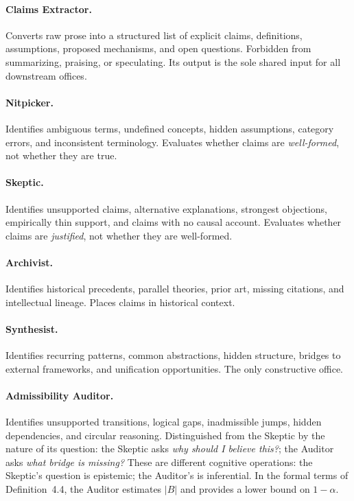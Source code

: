 \documentclass[12pt, a4paper]{article}
\theoremstyle{principle}
\theoremstyle{definition}
\begin{document}
\paragraph{Claims Extractor.}
Converts raw prose into a structured list of explicit claims, definitions,
assumptions, proposed mechanisms, and open questions. Forbidden from summarizing,
praising, or speculating. Its output is the sole shared input for all downstream
offices.

\paragraph{Nitpicker.}
Identifies ambiguous terms, undefined concepts, hidden assumptions, category errors,
and inconsistent terminology. Evaluates whether claims are \emph{well-formed}, not
whether they are true.

\paragraph{Skeptic.}
Identifies unsupported claims, alternative explanations, strongest objections,
empirically thin support, and claims with no causal account. Evaluates whether
claims are \emph{justified}, not whether they are well-formed.

\paragraph{Archivist.}
Identifies historical precedents, parallel theories, prior art, missing citations,
and intellectual lineage. Places claims in historical context.

\paragraph{Synthesist.}
Identifies recurring patterns, common abstractions, hidden structure, bridges to
external frameworks, and unification opportunities. The only constructive office.

\paragraph{Admissibility Auditor.}
Identifies unsupported transitions, logical gaps, inadmissible jumps, hidden
dependencies, and circular reasoning. Distinguished from the Skeptic by the nature
of its question: the Skeptic asks \emph{why should I believe this?}; the Auditor
asks \emph{what bridge is missing?} These are different cognitive operations: the
Skeptic's question is epistemic; the Auditor's is inferential. In the formal terms
of Definition~4.4, the Auditor estimates $|B|$ and provides a lower bound on
$1 - \alpha$.
\end{document}
